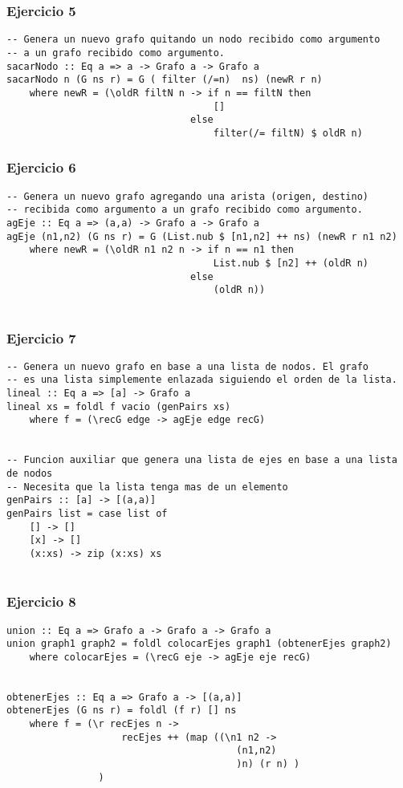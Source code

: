 \subsubsection*{Ejercicio 5}
\begin{lstlisting}
-- Genera un nuevo grafo quitando un nodo recibido como argumento
-- a un grafo recibido como argumento.
sacarNodo :: Eq a => a -> Grafo a -> Grafo a
sacarNodo n (G ns r) = G ( filter (/=n)  ns) (newR r n)
	where newR = (\oldR filtN n -> if n == filtN then 
									[]
								else
									filter(/= filtN) $ oldR n)

\end{lstlisting}
\vspace{1cm}

\subsubsection*{Ejercicio 6}
\begin{lstlisting}
-- Genera un nuevo grafo agregando una arista (origen, destino) 
-- recibida como argumento a un grafo recibido como argumento.
agEje :: Eq a => (a,a) -> Grafo a -> Grafo a
agEje (n1,n2) (G ns r) = G (List.nub $ [n1,n2] ++ ns) (newR r n1 n2)
	where newR = (\oldR n1 n2 n -> if n == n1 then
									List.nub $ [n2] ++ (oldR n)
								else
									(oldR n))


\end{lstlisting}
\vspace{1cm}

\subsubsection*{Ejercicio 7}
\begin{lstlisting}
-- Genera un nuevo grafo en base a una lista de nodos. El grafo
-- es una lista simplemente enlazada siguiendo el orden de la lista.
lineal :: Eq a => [a] -> Grafo a
lineal xs = foldl f vacio (genPairs xs)
	where f = (\recG edge -> agEje edge recG)
	
	
-- Funcion auxiliar que genera una lista de ejes en base a una lista de nodos
-- Necesita que la lista tenga mas de un elemento
genPairs :: [a] -> [(a,a)]
genPairs list = case list of
	[] -> []
	[x] -> []
	(x:xs) -> zip (x:xs) xs 


\end{lstlisting}
\vspace{1cm}

\subsubsection*{Ejercicio 8}
\begin{lstlisting}
union :: Eq a => Grafo a -> Grafo a -> Grafo a
union graph1 graph2 = foldl colocarEjes graph1 (obtenerEjes graph2)
	where colocarEjes = (\recG eje -> agEje eje recG)
	
							
obtenerEjes :: Eq a => Grafo a -> [(a,a)]
obtenerEjes (G ns r) = foldl (f r) [] ns
	where f = (\r recEjes n -> 
					recEjes ++ (map ((\n1 n2 -> 
										(n1,n2) 
										)n) (r n) ) 
				)
         
						
\end{lstlisting}
\vspace{1cm}

